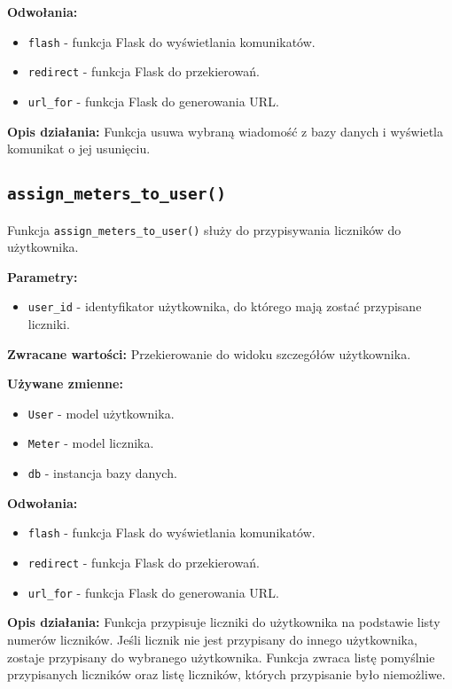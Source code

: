 \documentclass[12pt,a4paper]{report}
\begin{document}
\textbf{Odwołania:}
\begin{itemize}
    \item \texttt{flash} - funkcja Flask do wyświetlania komunikatów.
    \item \texttt{redirect} - funkcja Flask do przekierowań.
    \item \texttt{url\_for} - funkcja Flask do generowania URL.
\end{itemize}

\textbf{Opis działania:}
Funkcja usuwa wybraną wiadomość z bazy danych i wyświetla komunikat o jej usunięciu.

\subsection{\texttt{assign\_meters\_to\_user()}}
\label{sec:assign_meters_to_user}
Funkcja \texttt{assign\_meters\_to\_user()} służy do przypisywania liczników do użytkownika.

\textbf{Parametry:}
\begin{itemize}
    \item \texttt{user\_id} - identyfikator użytkownika, do którego mają zostać przypisane liczniki.
\end{itemize}

\textbf{Zwracane wartości:} Przekierowanie do widoku szczegółów użytkownika.

\textbf{Używane zmienne:}
\begin{itemize}
    \item \texttt{User} - model użytkownika.
    \item \texttt{Meter} - model licznika.
    \item \texttt{db} - instancja bazy danych.
\end{itemize}

\textbf{Odwołania:}
\begin{itemize}
    \item \texttt{flash} - funkcja Flask do wyświetlania komunikatów.
    \item \texttt{redirect} - funkcja Flask do przekierowań.
    \item \texttt{url\_for} - funkcja Flask do generowania URL.
\end{itemize}

\textbf{Opis działania:}
Funkcja przypisuje liczniki do użytkownika na podstawie listy numerów liczników. Jeśli licznik nie jest przypisany do innego użytkownika, zostaje przypisany do wybranego użytkownika. Funkcja zwraca listę pomyślnie przypisanych liczników oraz listę liczników, których przypisanie było niemożliwe.
\end{document}
